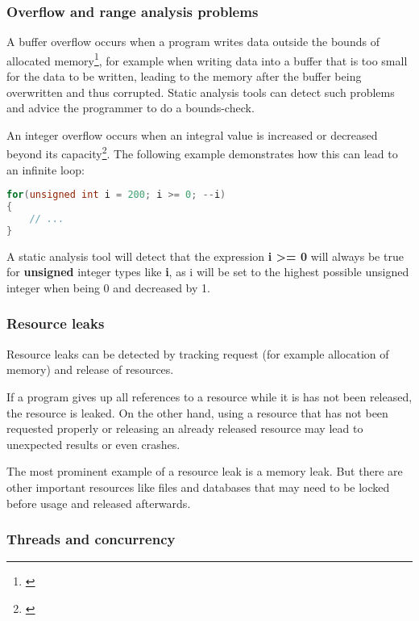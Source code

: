 \subsubsection{Overflow and range analysis problems}

A buffer overflow occurs when a program writes data outside the bounds of allocated memory\footnote{\citep[175]{SecureProgramming}}, for example when writing data into a buffer that is too small for the data to be written, leading to the memory after the buffer being overwritten and thus corrupted. Static analysis tools can detect such problems and advice the programmer to do a bounds-check.

An integer overflow occurs when an integral value is increased or decreased beyond its capacity\footnote{\citep[235]{SecureProgramming}}. The following example demonstrates how this can lead to an infinite loop:

\begin{lstlisting}[language=C++, caption=Integer ''underflow'' in C++]
for(unsigned int i = 200; i >= 0; --i)
{
	// ...
}
\end{lstlisting}

A static analysis tool will detect that the expression \textbf{i \textgreater= 0} will always be true for \textbf{unsigned} integer types like \textbf{i}, as i will be set to the highest possible unsigned integer when being 0 and decreased by 1.

\subsubsection{Resource leaks}

Resource leaks can be detected by tracking request (for example allocation of memory) and release of resources.

If a program gives up all references to a resource while it is has not been released, the resource is leaked. On the other hand, using a resource that has not been requested properly or releasing an already released resource may lead to unexpected results or even crashes.

The most prominent example of a resource leak is a memory leak. But there are other important resources like files and databases that may need to be locked before usage and released afterwards.

\subsubsection{Threads and concurrency}

